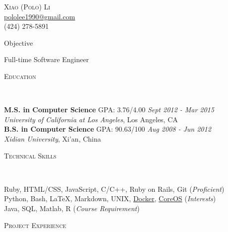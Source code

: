 \documentclass[9pt]{article}
\newenvironment{changemargin}[2]{%
  \begin{list}{}{%
    \setlength{\topsep}{0pt}%
    \setlength{\leftmargin}{#1}%
    \setlength{\rightmargin}{#2}%
    \setlength{\listparindent}{\parindent}%
    \setlength{\itemindent}{\parindent}%
    \setlength{\parsep}{\parskip}%
  }%
  \item[]}{\end{list}
  }
\newcommand{\lineover}{
  \begin{changemargin}{-0.05in}{-0.05in}
  \vspace*{-8pt}
  \hrulefill \\
  \vspace*{-2pt}
  \end{changemargin}
  }
\newcommand{\header}[1]{
  \begin{changemargin}{-0.5in}{-0.5in}
  \scshape{#1}\\
  \lineover
  \end{changemargin}
  }
\newcommand{\contact}[4]{
  \begin{changemargin}{-0.5in}{-0.5in}
  \begin{center}
  {\Large \scshape {#1}}\\ \smallskip
  {#2}\\ \smallskip
  {#3}\\ \smallskip
  {#4}\smallskip
  \end{center}
  \end{changemargin}
  }
\newenvironment{body} {
  \vspace*{-16pt}
  \begin{changemargin}{-0.25in}{-0.5in}
  }
  {\end{changemargin}
  }
\begin{document}
\contact{Xiao (Polo) Li}{\href{mailto:pololee1990@gmail.com}
  {pololee1990@gmail.com}}{(424) 278-5891}


\header{Objective}

\begin{body}
\vspace{14pt}
Full-time Software Engineer
\end{body}

\smallskip


\header{Education}

\begin{body}
  \vspace{14pt}
  \textbf{M.S. in Computer Science} \hspace{5mm} GPA: 3.76/4.00
  \hfill \emph{Sept 2012 - Mar 2015}{} \\
  \emph{University of California at Los Angeles}, Los Angeles, CA{} \\
  \medskip
  \textbf{B.S. in Computer Science} \hspace{6mm} GPA: 90.63/100
  \hfill \emph{Aug 2008 - Jun 2012} \\
  \emph{Xidian University}, Xi'an, China\\
\end{body}

\smallskip



\header{ Technical Skills}

\begin{body}
\vspace{14pt}
  Ruby, HTML/CSS, JavaScript, C/C++, Ruby on Rails, Git (\emph{Proficient})\\
  \smallskip
  Python, Bash, \LaTeX, Markdown, UNIX, \href{https://www.docker.com/}
    {Docker}, \href{https://coreos.com/}{CoreOS}  (\emph{Interests}) \\
  \smallskip
  Java, SQL, Matlab, R (\emph{Course Requirement}) \\
\end{body}

\smallskip
\header{Project Experience}
\end{document}
